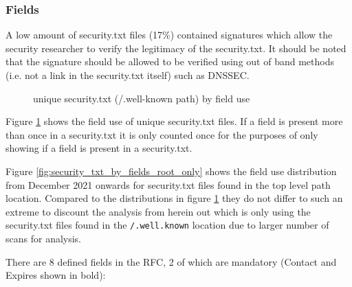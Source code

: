\documentclass{mscreport}
\begin{document}
\newpage

\subsubsection{Fields}

\noindent
A low amount of security.txt files (17\%) contained signatures which allow the security researcher to verify the legitimacy of the security.txt. It should be noted that the signature should be allowed to be verified using out of band methods (i.e. not a link in the security.txt itself) such as DNSSEC.

\begin{figure}[t]
	\begin{center}
		\caption{unique security.txt (/.well-known path) by field use}
		\label{fig:security_txt_by_fields}
	\end{center}
\end{figure}

\vspace{0.3cm} \noindent
Figure \ref{fig:security_txt_by_fields} shows the field use of unique security.txt files. If a field is present more than once in a security.txt it is only counted once for the purposes of only showing if a field is present in a security.txt.

\vspace{0.3cm} \noindent
Figure \ref{fig:security_txt_by_fields_root_only} shows the field use distribution from December 2021 onwards for security.txt files found in the top level path location. Compared to the distributions in figure \ref{fig:security_txt_by_fields} they do not differ to such an extreme to discount the analysis from herein out which is only using the security.txt files found in the \texttt{/.well.known} location due to larger number of scans for analysis.

\vspace{0.3cm} \noindent
There are 8 defined fields in the RFC, 2 of which are mandatory (Contact and Expires shown in bold):
\end{document}
